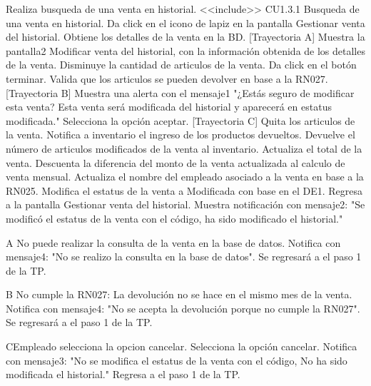 \begin{UCtrayectoria}

	\UCpaso [\UCactor]  Realiza busqueda de una venta en historial. <<include>> CU1.3.1 Busqueda de una venta en historial.
	\UCpaso [\UCactor]  Da click en el icono de lapiz en la pantalla Gestionar venta del historial. 
	\UCpaso [\UCsist] Obtiene los detalles de la venta en la BD. [Trayectoria A]
	\UCpaso [\UCsist] Muestra la pantalla2 Modificar venta del historial, con la información obtenida de los detalles de la venta.
	\UCpaso [\UCactor] Disminuye la cantidad de articulos de la venta.
	\UCpaso [\UCactor] Da click en el botón terminar. 
	\UCpaso [\UCsist] Valida que los articulos se pueden devolver en base a la RN027. [Trayectoria B]
	\UCpaso [\UCsist] Muestra una alerta con el mensaje1 "¿Estás seguro de modificar esta venta? Esta venta será modificada del historial y aparecerá en estatus modificada."
	\UCpaso [\UCactor] Selecciona la opción aceptar.  [Trayectoria C]
	\UCpaso [\UCactor] Quita los articulos de la venta.
	\UCpaso [\UCsist] Notifica a inventario el ingreso de los productos devueltos.
	\UCpaso [\UCsist] Devuelve el número de articulos modificados de la venta al inventario.
	\UCpaso [\UCsist] Actualiza el total de la venta.
	\UCpaso[\UCsist] Descuenta la diferencia del monto de la venta actualizada al calculo de venta mensual.
	\UCpaso [\UCsist] Actualiza el nombre del empleado asociado a la venta en base a la RN025.
	\UCpaso [\UCsist] Modifica el estatus de la venta a Modificada con base en el DE1.
	\UCpaso [\UCsist] Regresa a la pantalla Gestionar venta del historial.
	\UCpaso [\UCsist] Muestra notificación con mensaje2: "Se modificó el estatus de la venta con el código, ha sido modificado el historial."
\end{UCtrayectoria}


\begin{UCtrayectoriaA}{A}{ No puede realizar la consulta de la venta en la base de datos.}
	\UCpaso [\UCsist] Notifica con mensaje4: "No se realizo la consulta en la base de datos".
	\UCpaso [\UCsist] Se regresará a el paso 1 de la TP.
\end{UCtrayectoriaA}
\begin{UCtrayectoriaA}{B}{ No cumple la RN027: La devolución no se hace en el mismo mes de la venta.}
	\UCpaso [\UCsist] Notifica con mensaje4: "No se acepta la devolución porque no cumple la RN027".
	\UCpaso [\UCsist] Se regresará a el paso 1 de la TP.
\end{UCtrayectoriaA}
\begin{UCtrayectoriaA}{C}{Empleado selecciona la opcion cancelar.}
	\UCpaso [\UCactor] Selecciona la opción cancelar.
	\UCpaso [\UCsist] Notifica con mensaje3: "No se modifica el estatus de la venta con el código, No ha sido modificada el historial."
	\UCpaso [\UCsist] Regresa a el paso 1 de la TP.

\end{UCtrayectoriaA}